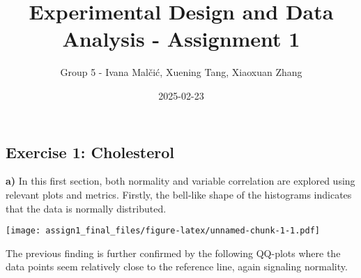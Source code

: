\documentclass[
]{article}
\title{Experimental Design and Data Analysis - Assignment 1}
\author{Group 5 - Ivana Malčić, Xuening Tang, Xiaoxuan Zhang}
\date{2025-02-23}
\newenvironment{Shaded}{\begin{snugshade}}{\end{snugshade}}
\newcommand{\AttributeTok}[1]{\textcolor[rgb]{0.13,0.29,0.53}{#1}}
\newcommand{\CommentTok}[1]{\textcolor[rgb]{0.56,0.35,0.01}{\textit{#1}}}
\newcommand{\DecValTok}[1]{\textcolor[rgb]{0.00,0.00,0.81}{#1}}
\newcommand{\FunctionTok}[1]{\textcolor[rgb]{0.13,0.29,0.53}{\textbf{#1}}}
\newcommand{\NormalTok}[1]{#1}
\newcommand{\OtherTok}[1]{\textcolor[rgb]{0.56,0.35,0.01}{#1}}
\newcommand{\SpecialCharTok}[1]{\textcolor[rgb]{0.81,0.36,0.00}{\textbf{#1}}}
\newcommand{\StringTok}[1]{\textcolor[rgb]{0.31,0.60,0.02}{#1}}
\begin{document}
\maketitle

\subsection{Exercise 1: Cholesterol}\label{exercise-1-cholesterol}

\textbf{a)} In this first section, both normality and variable
correlation are explored using relevant plots and metrics. Firstly, the
bell-like shape of the histograms indicates that the data is normally
distributed.

\begin{Shaded}
\end{Shaded}

\texttt{[image: assign1\_final\_files/figure-latex/unnamed-chunk-1-1.pdf]}

The previous finding is further confirmed by the following QQ-plots
where the data points seem relatively close to the reference line, again
signaling normality.
\end{document}
